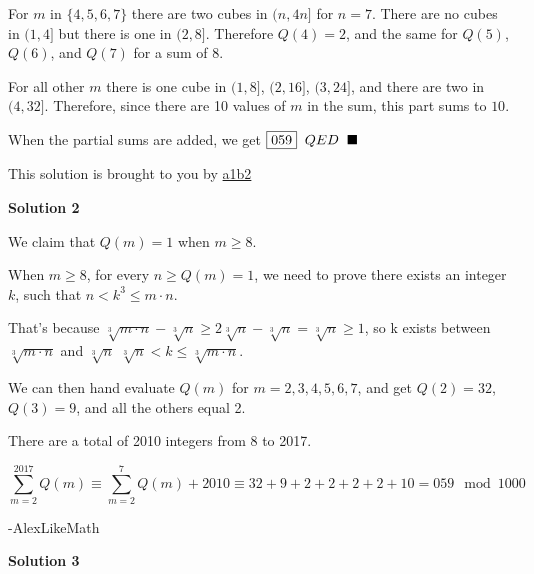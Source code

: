 \begin{enumerate}
 For $m$ in $\{4,5,6,7\}$ there are two cubes in $(n,4n]$ for $n=7$. There are no cubes in $(1,4]$ but there is one in $(2,8]$. Therefore $Q(4)=2$, and the same for $Q(5)$, $Q(6)$, and $Q(7)$ for a sum of $8$.

 For all other $m$ there is one cube in $(1,8]$, $(2,16]$, $(3,24]$, and there are two in $(4,32]$. Therefore, since there are 10 values of $m$ in the sum, this part sums to $10$.

 When the partial sums are added, we get $\boxed{059}\hspace{2 mm}QED\hspace{2 mm} \blacksquare$

 This solution is brought to you by \href{https://artofproblemsolving.com/wiki/index.php?title=User:A1b2}{a1b2}

 



\textbf{Solution 2}

We claim that $Q(m) = 1$ when $m \ge 8$. 

 When $m \ge 8$, for every $n \ge Q(m) = 1$, we need to prove there exists an integer $k$, such that $n < k^3 \le m \cdot n$.

 That's because $\sqrt[3]{m \cdot n} - \sqrt[3]{n} \ge 2\sqrt[3]{n} - \sqrt[3]{n} = \sqrt[3]{n} \ge 1$, so k exists between $\sqrt[3]{m \cdot n}$  and $\sqrt[3]{n}$
$\sqrt[3]{n} < k \le \sqrt[3]{m \cdot n}$.

 We can then hand evaluate $Q(m)$ for $m = 2,3,4,5,6,7$, and get $Q(2) = 32$, $Q(3) = 9$, and all the others equal 2.

 There are a total of 2010 integers from 8 to 2017.

 
 \[\sum_{m = 2}^{2017} Q(m) \equiv \sum_{m = 2}^{7} Q(m) + 2010 \equiv 32+9+2+2+2+2+10 = \boxed{059} \mod 1000\]

 -AlexLikeMath

 



\textbf{Solution 3}


\end{enumerate}
